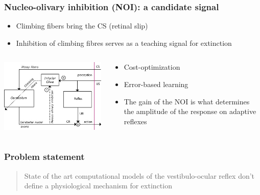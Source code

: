 \documentclass[10pt, compress]{beamer}
\begin{document}
\begin{frame}[fragile]
  \frametitle{Nucleo-olivary inhibition (NOI): a candidate signal}
  \begin{itemize}
    \item Climbing fibers bring the CS (retinal slip)
    \item Inhibition of climbing fibres serves as a teaching signal for extinction
  \end{itemize}
  \cite{Medina2002}
  \begin{columns}[T]
    \begin{column}[T]{5cm}
      \includegraphics[scale=0.6]{images/noi.jpg}
    \end{column}
    \begin{column}[T]{5cm}
      \begin{itemize}
        \item Cost-optimization
        \item Error-based learning
        \item The gain of the NOI is what determines the amplitude of the response on adaptive reflexes
      \end{itemize}
    \end{column}
  \end{columns}
  \cite{Emken2007, Herreros2013b}
\end{frame}

\begin{frame}[fragile]
  \frametitle{Problem statement}
  \begin{quote}
    State of the art computational models of the vestibulo-ocular reflex don't define a physiological mechanism for extinction
  \end{quote}
\end{frame}
\end{document}
